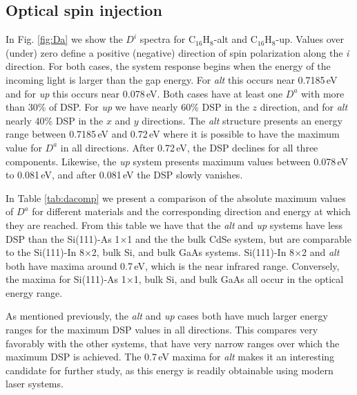 \documentclass[pss]{wiley2sp} %
\begin{document}
\subsection{Optical spin injection}\label{subsec:results-DSP}

In Fig. \ref{fig:Da} we show the $D^{i}$ spectra for C$_{16}$H$_{8}$-alt and C$_{16}$H$_{8}$-up. Values over (under) zero define a positive (negative) direction of spin polarization along the \emph{i} direction. For both cases, the system response begins when the energy of the incoming light is larger than the gap energy. For \emph{alt} this occurs near 0.7185\,eV and for \emph{up} this occurs near 0.078\,eV. Both cases have at least one {$D^{a}$} with more than 30\% of DSP. For \emph{up} we have nearly 60\% DSP in the $z$ direction, and for \emph{alt} nearly 40\% DSP in the $x$ and $y$ directions. The \emph{alt} structure presents an energy range between 0.7185\,eV and 0.72\,eV where it is possible to have the maximum value for $D^{a}$ in all directions. After 0.72\,eV, the DSP declines for all three components. Likewise, the \emph{up} system presents maximum values between 0.078\,eV to 0.081\,eV, and after 0.081\,eV the DSP slowly vanishes. 

In Table \ref{tab:dacomp} we present a comparison of the absolute maximum values of $D^{a}$ for different materials and the corresponding direction and energy at which they are reached. From this table we have that the \emph{alt} and \emph{up} systems have less DSP than the Si(111)-As 1$\times$1 and the the bulk CdSe system, but are comparable to the Si(111)-In 8$\times$2, bulk Si, and bulk GaAs systems. Si(111)-In 8$\times$2 and \emph{alt} both have maxima around 0.7\,eV, which is the near infrared range. Conversely, the maxima for Si(111)-As 1$\times$1, bulk Si, and bulk GaAs all occur in the optical energy range.

As mentioned previously, the \emph{alt} and \emph{up} cases both have much larger energy ranges for the maximum DSP values in all directions. This compares very favorably with the other systems, that have very narrow ranges over which the maximum DSP is achieved. The 0.7\,eV maxima for \emph{alt} makes it an interesting candidate for further study, as this energy is readily obtainable using modern laser systems.
\end{document}
